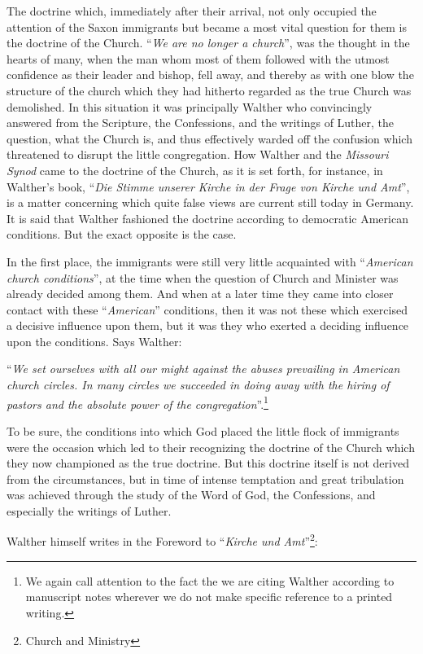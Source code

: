                 The doctrine which, immediately after their arrival, not only occupied the attention of the Saxon immigrants but became a most vital question for them is the doctrine of the Church.  “\textit{We are no longer a church}”, was the thought in the hearts of many, when the man whom most of them followed with the utmost confidence as their leader and bishop, fell away, and thereby as with one blow the structure of the church which they had hitherto regarded as the true Church was demolished.  In this situation it was principally Walther who convincingly answered from the Scripture, the Confessions, and the writings of Luther, the question, what the Church is, and thus effectively warded off the confusion which threatened to disrupt the little congregation.
\divider
How Walther and the \textit{Missouri Synod} came to the doctrine of the Church, as it is set forth, for instance, in Walther’s book, “\textit{Die Stimme unserer Kirche in der Frage von Kirche und Amt}”, is a matter concerning which quite false views are current still today in Germany.  It is said that Walther fashioned the doctrine according to democratic American conditions.  But the exact opposite is the case. \par In the first place, the immigrants were still very little acquainted with “\textit{American church conditions}'', at the time when the question of Church and Minister was already decided among them.  And when at a later time they came into closer contact with these “\textit{American}” conditions, then it was not these which exercised a decisive influence upon them, but it was they who exerted a deciding influence upon the conditions.  Says Walther: \begin{displayquote}“\textit{We set ourselves with all our might against the abuses prevailing in American church circles. In many circles we succeeded in doing away with the hiring of pastors and the absolute power of the congregation}”.\footnote{We again call attention to the fact the we are citing Walther according to manuscript notes wherever we do not make specific reference to a printed writing.}\end{displayquote} To be sure, the conditions into which God placed the little flock of immigrants were the occasion which led to their recognizing the doctrine of the Church which they now championed as the true doctrine.  But this doctrine itself is not derived from the circumstances, but in time of intense temptation and great tribulation was achieved through the study of the Word of God, the Confessions, and especially the writings of Luther. \par Walther himself writes in the Foreword to “\textit{Kirche und Amt}”\footnote{Church and Ministry}:
